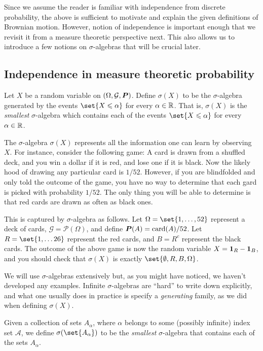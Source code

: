 Since we assume the reader is familiar with independence from discrete probability, the above is sufficient to motivate and explain the given definitions of Brownian motion.
However, notion of independence is important enough that we revisit it from a measure theoretic perspective next.
This also allows us to introduce a few notions on $\sigma$-algebras that will be crucial later.

\subsection{Independence in measure theoretic probability}


\begin{definition}
  Let $X$ be a random variable on $(\Omega, \mathcal G, \P)$.
  Define $\sigma(X)$ to be the  $\sigma$-algebra generated by the events $\set{X \leq \alpha}$ for every $\alpha \in \R$.
  That is, $\sigma(X)$ is the \emph{smallest} $\sigma$-algebra which contains each of the events $\set{X \leq \alpha}$ for every $\alpha \in \R$.
\end{definition}

\begin{remark}
  The $\sigma$-algebra $\sigma(X)$ represents all the information one can learn by observing $X$.
  For instance, consider the following game: A card is drawn from a shuffled deck, and you win a dollar if it is red, and lose one if it is black.
  Now the likely hood of drawing any particular card is $1/52$.
  However, if you are blindfolded and only told the outcome of the game, you have no way to determine that each gard is picked with probability $1/52$.
  The only thing you will be able to determine is that red cards are drawn as often as black ones.

  This is captured by $\sigma$-algebra as follows.
  Let $\Omega = \set{1, \dots, 52}$ represent a deck of cards, $\mathcal G = \mathcal P(\Omega)$, and define $\P(A) = \operatorname{card}(A)/52$.
  Let $R = \set{1, \dots 26}$ represent the red cards, and $B = R^c$ represent the black cards.
  The outcome of the above game is now the random variable $X = \one_R - \one_B$, and you should check that $\sigma(X)$ is exactly $\set{ \emptyset, R, B, \Omega}$.
\end{remark}

We will use $\sigma$-algebras extensively but, as you might have noticed, we haven't developed any examples.
Infinite $\sigma$-algebras are ``hard'' to write down explicitly, and what one usually does in practice is specify a \emph{generating} family, as we did when defining $\sigma(X)$.
\begin{definition}
  Given a collection of sets $A_\alpha$, where $\alpha$ belongs to some (possibly infinite) index set $\mathcal A$, we define $\sigma(\set{A_\alpha})$ to be the \emph{smallest} $\sigma$-algebra that contains each of the sets $A_\alpha$.
\end{definition}

